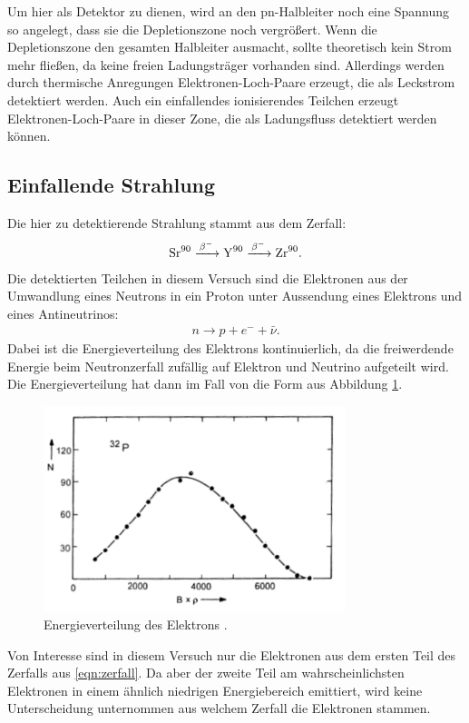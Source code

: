 Um hier als Detektor zu dienen, wird an den pn-Halbleiter noch eine Spannung so angelegt, dass sie die Depletionszone noch vergrößert.
Wenn die Depletionszone den gesamten Halbleiter ausmacht, sollte theoretisch kein Strom mehr fließen, da keine freien Ladungsträger vorhanden sind. Allerdings werden durch thermische Anregungen Elektronen-Loch-Paare erzeugt, die als Leckstrom detektiert werden. Auch ein einfallendes ionisierendes Teilchen erzeugt Elektronen-Loch-Paare in dieser Zone, die als Ladungsfluss detektiert werden können.

\subsection{Einfallende Strahlung}

Die hier zu detektierende Strahlung stammt aus dem Zerfall:
\begin{align}
  \ce{Sr^{90} ->[$\beta^-$] Y^{90} ->[$\beta^-$] Zr^{90}}. \label{eqn:zerfall}
\end{align}
Die detektierten Teilchen in diesem Versuch sind die Elektronen aus der Umwandlung eines Neutrons in ein Proton unter Aussendung eines Elektrons und eines Antineutrinos:
\begin{align*}
  n \to p + e^- + \bar \nu.
\end{align*}
Dabei ist die Energieverteilung des Elektrons kontinuierlich, da die freiwerdende Energie beim Neutronzerfall zufällig auf Elektron und Neutrino aufgeteilt wird. Die Energieverteilung hat dann im Fall von  die Form aus Abbildung \ref{fig:elektronenergie}.
\begin{figure}
  \centering
  \includegraphics[height=6cm]{TimosAufrisse/elektronenenergie.png}
  \caption{Energieverteilung des Elektrons \cite{anleitung}.}
  \label{fig:elektronenergie}
\end{figure}
Von Interesse sind in diesem Versuch nur die Elektronen aus dem ersten Teil des Zerfalls aus \eqref{eqn:zerfall}. Da aber der zweite Teil am wahrscheinlichsten Elektronen in einem ähnlich niedrigen Energiebereich emittiert, wird keine Unterscheidung unternommen aus welchem Zerfall die Elektronen stammen.

